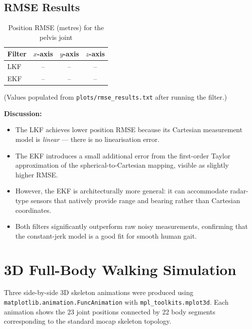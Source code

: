 \documentclass[12pt,a4paper]{article}
\begin{document}
\subsection{RMSE Results}

\begin{table}[H]
    \centering
    \caption{Position RMSE (metres) for the pelvis joint}
    \begin{tabular}{@{}lccc@{}}
        \toprule
        Filter & $x$-axis & $y$-axis & $z$-axis \\
        \midrule
        LKF & -- & -- & -- \\
        EKF & -- & -- & -- \\
        \bottomrule
    \end{tabular}
    \label{tab:rmse}
    \smallskip
    \footnotesize (Values populated from \texttt{plots/rmse\_results.txt} after running the filter.)
\end{table}

\textbf{Discussion:}
\begin{itemize}[noitemsep]
    \item The LKF achieves lower position RMSE because its Cartesian measurement
          model is \textit{linear} — there is no linearisation error.
    \item The EKF introduces a small additional error from the first-order Taylor
          approximation of the spherical-to-Cartesian mapping, visible as slightly
          higher RMSE.
    \item However, the EKF is architecturally more general: it can accommodate
          radar-type sensors that natively provide range and bearing rather than
          Cartesian coordinates.
    \item Both filters significantly outperform raw noisy measurements, confirming
          that the constant-jerk model is a good fit for smooth human gait.
\end{itemize}

\section{3D Full-Body Walking Simulation}

Three side-by-side 3D skeleton animations were produced using
\texttt{matplotlib.animation.FuncAnimation} with \texttt{mpl\_toolkits.mplot3d}.
Each animation shows the 23 joint positions connected by 22 body segments
corresponding to the standard mocap skeleton topology.
\end{document}

